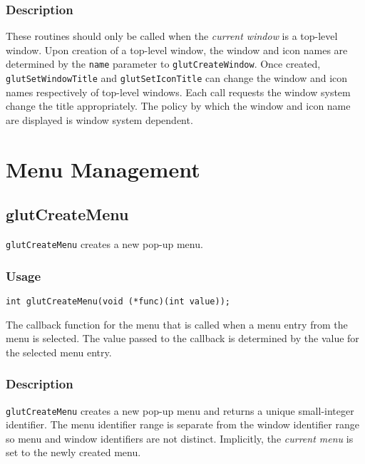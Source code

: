 \subsubsection*{Description}

These routines should only be called when the {\em current window}
is a top-level window.  Upon creation of a top-level window,
the window and icon names are determined by the {\tt name}
parameter to {\tt glutCreateWindow}.  Once created, {\tt glutSetWindowTitle}
and {\tt glutSetIconTitle} can change the window and icon names
respectively of top-level windows.  Each call requests the
window system change the title appropriately.  The policy by which
the window and icon name are displayed is window system dependent.

\section{Menu Management}

\subsection{glutCreateMenu}

{\tt glutCreateMenu} creates a new pop-up menu.

\subsubsection*{Usage}

\begin{verbatim}
int glutCreateMenu(void (*func)(int value));
\end{verbatim}
\begin{description}
\itemsep 0in
\item[\tt func]
The callback function for the menu that is called when a menu
entry from the menu is selected.  The value passed to the callback
is determined by the value for the selected menu entry.
\end{description}

\subsubsection*{Description}

{\tt glutCreateMenu} creates a new pop-up menu and returns a unique small-integer
identifier.  The menu identifier range is separate from the window identifier range
so menu and window identifiers are not distinct.
Implicitly, the {\em current menu} is set to the newly created menu.

